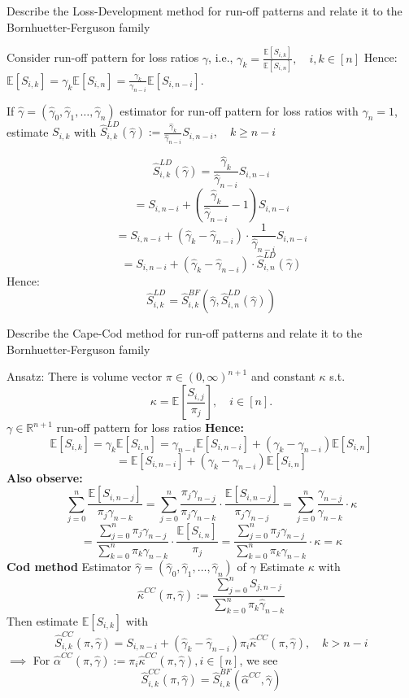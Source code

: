 \documentclass[11pt,a4paper,twoside]{article}
\begin{document}
Describe the Loss-Development method for run-off patterns and relate it to the Bornhuetter-Ferguson family

Consider run-off pattern for loss ratios \( \gamma \), i.e.,
\(
\gamma_k = \frac{\mathbb{E}[S_{i,k}]}{\mathbb{E}[S_{i,n}]}, \quad i, k \in [n]
\)
Hence: \(\mathbb{E}[S_{i,k}] = \gamma_k \mathbb{E}[S_{i,n}] = \frac{\gamma_k}{\gamma_{n-i}} \mathbb{E}[S_{i,n-i}].\) 

If \(\widehat{\gamma} = (\widehat{\gamma}_0, \widehat{\gamma}_1, \dots, \widehat{\gamma}_n)\) estimator for run-off pattern for loss ratios with 
\(\widehat{\gamma}_n = 1\), estimate \(S_{i,k}\) with
\(
\widehat{S}_{i,k}^{LD}(\widehat{\gamma}) := \frac{\widehat{\gamma}_k}{\widehat{\gamma}_{n-i}} S_{i,n-i}, \quad k \ge n-i
\)


\[
\widehat{S}_{i,k}^{LD}(\widehat{\gamma}) = \frac{\widehat{\gamma}_k}{\widehat{\gamma}_{n-i}} S_{i,n-i}
\]
\[
= S_{i,n-i} + \left(\frac{\widehat{\gamma}_k}{\widehat{\gamma}_{n-i}} - 1\right) S_{i,n-i}
\]
\[
= S_{i,n-i} + (\widehat{\gamma}_k - \widehat{\gamma}_{n-i}) \cdot \frac{1}{\widehat{\gamma}_{n-i}} S_{i,n-i}
\]
\[
= S_{i,n-i} + (\widehat{\gamma}_k - \widehat{\gamma}_{n-i}) \cdot \widehat{S}_{i,n}^{LD}(\widehat{\gamma})
\]
Hence:
\[
\widehat{S}_{i,k}^{LD} = \widehat{S}_{i,k}^{BF}(\widehat{\gamma}, \widehat{S}_{i,n}^{LD}(\widehat{\gamma}))
\]


Describe the Cape-Cod method for run-off patterns and relate it to the Bornhuetter-Ferguson family

Ansatz: There is volume vector $\pi \in (0, \infty)^{n+1}$ and constant $\kappa$ s.t.
\[
\kappa = \mathbb{E}\left[\frac{S_{i,j}}{\pi_j}\right], \quad i \in [n].
\]
$\gamma \in \mathbb{R}^{n+1}$ run-off pattern for loss ratios
\textbf{Hence:}
\[
\mathbb{E}[S_{i,k}] = \gamma_k \mathbb{E}[S_{i,n}] = \gamma_{n-i} \mathbb{E}[S_{i,n-i}] + (\gamma_k - \gamma_{n-i}) \mathbb{E}[S_{i,n}]
\]
\[
= \mathbb{E}[S_{i,n-i}] + (\gamma_k - \gamma_{n-i}) \mathbb{E}[S_{i,n}]
\]
\textbf{Also observe:}
\[
\sum_{j=0}^n \frac{\mathbb{E}[S_{i,n-j}]}{\pi_j \gamma_{n-k}} = \sum_{j=0}^n \frac{\pi_{j} \gamma_{n-j}}{\pi_j \gamma_{n-k}} \cdot \frac{\mathbb{E}[S_{i,n-j}]}{\pi_j \gamma_{n-j}} = \sum_{j=0}^n \frac{\gamma_{n-j}}{\gamma_{n-k}} \cdot \kappa
\]
\[
= \frac{\sum_{j=0}^n \pi_j \gamma_{n-j}}{\sum_{k=0}^n \pi_k \gamma_{n-k}} \cdot \frac{\mathbb{E}[S_{i,n}]}{\pi_j} = \frac{\sum_{j=0}^n \pi_j \gamma_{n-j}}{\sum_{k=0}^n \pi_k \gamma_{n-k}} \cdot \kappa = \kappa
\]
\textbf{Cod method}
Estimator $\widehat{\gamma} = (\widehat{\gamma}_0, \widehat{\gamma}_1, \dots, \widehat{\gamma}_n)$ of $\gamma$
Estimate $\kappa$ with
\[
\widehat{\kappa}^{CC}(\pi, \widehat{\gamma}) := \frac{\sum_{j=0}^n S_{j,n-j}}{\sum_{k=0}^n \pi_k \widehat{\gamma}_{n-k}}
\]
Then estimate $\mathbb{E}[S_{i,k}]$ with
\[
\widehat{S}_{i,k}^{CC}(\pi, \widehat{\gamma}) = S_{i,n-i} + (\widehat{\gamma}_k - \widehat{\gamma}_{n-i}) \pi_i \widehat{\kappa}^{CC}(\pi, \widehat{\gamma}), \quad k > n-i
\]
$\implies$ For $\widehat{\alpha}^{CC}(\pi, \widehat{\gamma}) := \pi_i \widehat{\kappa}^{CC}(\pi, \widehat{\gamma}), i \in [n]$, we see
\[
\widehat{S}_{i,k}^{CC}(\pi, \widehat{\gamma}) = \widehat{S}_{i,k}^{BF}(\widehat{\alpha}^{CC}, \widehat{\gamma})
\]
\end{document}
